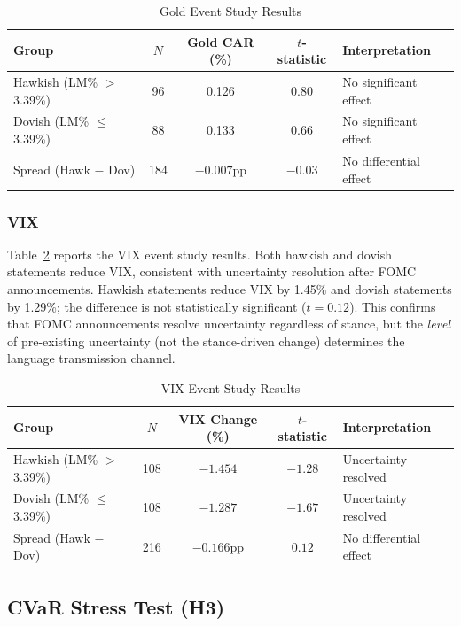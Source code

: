 \documentclass[11pt]{article}
\begin{document}
\begin{table}[htbp]
\centering
\caption{Gold Event Study Results}
\label{tab:gold}
\begin{tabular}{lcccl}
\toprule
Group & $N$ & Gold CAR (\%) & $t$-statistic & Interpretation \\
\midrule
Hawkish (LM\% $>$ 3.39\%) & 96  & 0.126 & 0.80 & No significant effect \\
Dovish (LM\% $\leq$ 3.39\%) & 88  & 0.133 & 0.66 & No significant effect \\
Spread (Hawk $-$ Dov) & 184 & $-0.007$pp & $-0.03$ & No differential effect \\
\bottomrule
\end{tabular}
\end{table}

\subsubsection{VIX}

Table~\ref{tab:vix} reports the VIX event study results. Both hawkish and dovish statements reduce VIX, consistent with uncertainty resolution after FOMC announcements. Hawkish statements reduce VIX by 1.45\% and dovish statements by 1.29\%; the difference is not statistically significant ($t = 0.12$). This confirms that FOMC announcements resolve uncertainty regardless of stance, but the \textit{level} of pre-existing uncertainty (not the stance-driven change) determines the language transmission channel.

\begin{table}[htbp]
\centering
\caption{VIX Event Study Results}
\label{tab:vix}
\begin{tabular}{lcccl}
\toprule
Group & $N$ & VIX Change (\%) & $t$-statistic & Interpretation \\
\midrule
Hawkish (LM\% $>$ 3.39\%) & 108 & $-1.454$ & $-1.28$ & Uncertainty resolved \\
Dovish (LM\% $\leq$ 3.39\%) & 108 & $-1.287$ & $-1.67$ & Uncertainty resolved \\
Spread (Hawk $-$ Dov) & 216 & $-0.166$pp & $0.12$ & No differential effect \\
\bottomrule
\end{tabular}
\end{table}

\subsection{CVaR Stress Test (H3)}
\end{document}
